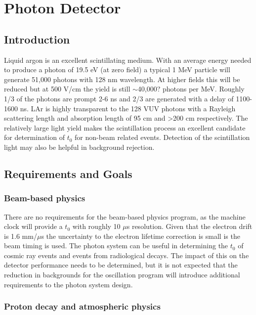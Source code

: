 \chapter{Photon Detector}
\label{ch:photon}
\section{Introduction}

Liquid argon is an excellent scintillating medium. With an average
energy needed to produce a photon of 19.5 eV (at zero field) a typical
1 MeV particle will generate 51,000 photons with 128 nm wavelength. At
higher fields this will be reduced but at 500 V/cm the yield is still
$\sim$40,000?  photons per MeV. Roughly 1/3 of the photons are prompt
2-6 ns and 2/3 are generated with a delay of 1100-1600 ns. LAr is
highly transparent to the 128 VUV photons with a Rayleigh scattering
length and absorption length of 95 cm and >200 cm respectively. The
relatively large light yield makes the scintillation process an
excellent candidate for determination of $t_{0}$ for non-beam related
events. Detection of the scintillation light may also be helpful in
background rejection.

\section{Requirements and Goals}

\subsection{Beam-based physics}

There are no requirements for the beam-based physics program, as the
machine clock will provide a $t_{0}$ with roughly 10 $\mu$s
resolution. Given that the electron drift is 1.6 mm/$\mu$s the
uncertainty to the electron lifetime correction is small is the beam
timing is used. The photon system can be useful in determining the
$t_{0}$ of cosmic ray events and events from radiological decays. The
impact of this on the detector performance needs to be determined, but
it is not expected that the reduction in backgrounds for the
oscillation program will introduce additional requirements to the
photon system design.

\subsection{Proton decay and atmospheric physics}

